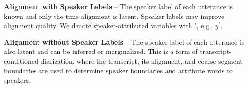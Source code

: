 \textbf{Alignment with Speaker Labels} -- The speaker label of each utterance is known and only the time alignment is latent. Speaker labels may improve alignment quality. We denote speaker-attributed variables with $\prime$, e.g., $y^\prime$.

\textbf{Alignment without Speaker Labels} -- The speaker label of each utterance is also latent and can be inferred or marginalized. This is a form of transcript-conditioned diarization, where the transcript, its alignment, and coarse segment boundaries are used to determine speaker boundaries and attribute words to speakers.
